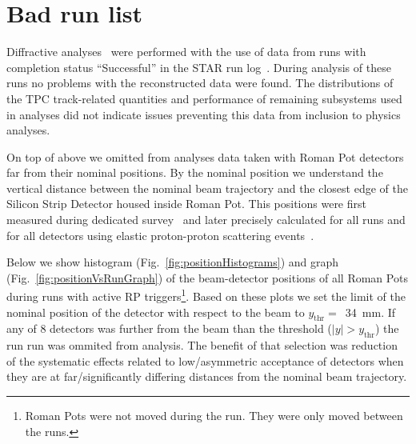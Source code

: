 

\chapter{Bad run list}\label{chap:badRunList}

Diffractive analyses~\cite{AnalysisNoteRafal,AnalysisNoteLukasz} were performed with the use of data from runs with completion status ``Successful'' in the STAR run log~\cite{RunLog}. During analysis of these runs no problems with the reconstructed data were found. The distributions of the TPC track-related quantities and performance of remaining subsystems used in analyses did not indicate issues preventing this data from inclusion to physics analyses.

On top of above we omitted from analyses data taken with Roman Pot detectors far from their nominal positions. By the nominal position we understand the vertical distance between the nominal beam trajectory and the closest edge of the Silicon Strip Detector housed inside Roman Pot. This positions were first measured during dedicated survey~\cite{surveyNote} and later precisely calculated for all runs and for all detectors using elastic proton-proton scattering events~\cite{alignmentPresentation, alignmentNote, alignmentDirectory}.

Below we show histogram (Fig.~\ref{fig:positionHistograms}) and graph (Fig.~\ref{fig:positionVsRunGraph}) of the beam-detector positions of all Roman Pots during runs with active RP triggers\footnote{Roman Pots were not moved during the run. They were only moved between the runs.}. Based on these plots we set the limit of the nominal position of the detector with respect to the beam to $y_{\text{thr}} =$~34~mm. If any of 8 detectors was further from the beam than the threshold ($|y|>y_{\text{thr}}$) the run run was ommited from analysis. The benefit of that selection was reduction of the systematic effects related to low/asymmetric acceptance of detectors when they are at far/significantly differing distances from the nominal beam trajectory.

